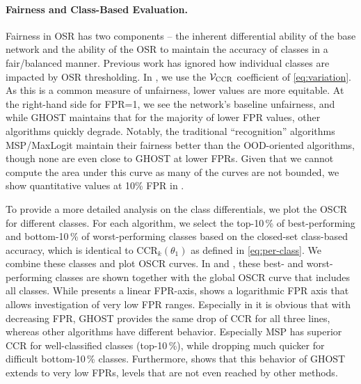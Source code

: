 \paragraph{Fairness and Class-Based Evaluation.}
Fairness in OSR has two components -- the inherent differential ability of the base network and the ability of the OSR to maintain the accuracy of classes in a fair/balanced manner.  
Previous work has ignored how individual classes are impacted by OSR thresholding.  
In , we use the ${\cal V}_{\mathrm{CCR}}$ coefficient of \eqref{eq:variation}.
As this is a common measure of unfairness, lower values are more equitable.  
At the right-hand side for FPR=1, we see the network's baseline unfairness, and while GHOST maintains that for the majority of lower FPR values, other algorithms quickly degrade.  
Notably, the traditional ``recognition'' algorithms MSP/MaxLogit maintain their fairness better than the OOD-oriented algorithms, though none are even close to GHOST at lower FPRs.   
Given that we cannot compute the area under this curve as many of the curves are not bounded, we show quantitative values at 10\% FPR in .

To provide a more detailed analysis on the class differentials, we plot the OSCR for different classes.
For each algorithm, we select the top-10\,\% of best-performing and bottom-10\,\% of worst-performing classes based on the closed-set class-based accuracy, which is identical to CCR$_k(\theta_1)$ as defined in \eqref{eq:per-class}.
We combine these classes and plot OSCR curves.
In  and , these best- and worst-performing classes are shown together with the global OSCR curve that includes all classes.
While  presents a linear FPR-axis,  shows a logarithmic FPR axis that allows investigation of very low FPR ranges.
Especially in  it is obvious that with decreasing FPR, GHOST provides the same drop of CCR for all three lines, whereas other algorithms have different behavior.
Especially MSP has superior CCR for well-classified classes (top-10\,\%), while dropping much quicker for difficult bottom-10\,\% classes.
Furthermore,  shows that this behavior of GHOST extends to very low FPRs, levels that are not even reached by other methods.


